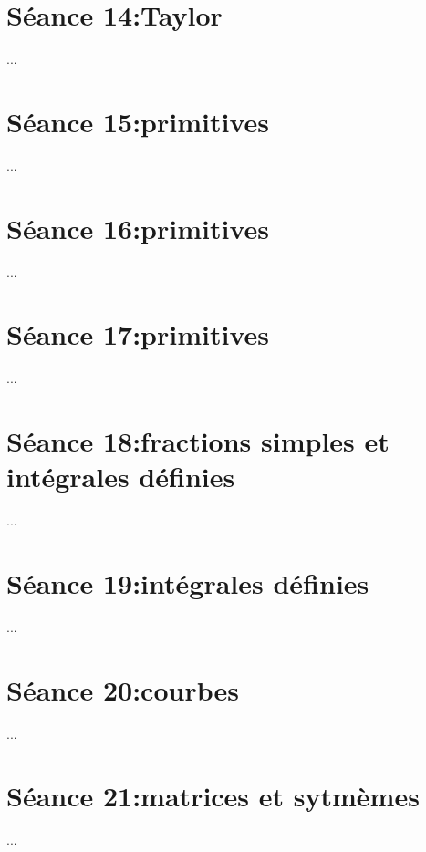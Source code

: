 \documentclass[12pt]{article}
\begin{document}
\section*{S\'eance 14:Taylor}
...
\section*{S\'eance 15:primitives}
...
\section*{S\'eance 16:primitives}
...
\section*{S\'eance 17:primitives}
...
\section*{S\'eance 18:fractions simples et intégrales définies}
...
\section*{S\'eance 19:int\'egrales d\'efinies}
...
\section*{S\'eance 20:courbes}
...
\section*{S\'eance 21:matrices et sytm\`emes}
...
\end{document}
